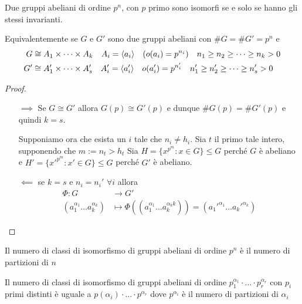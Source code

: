 \begin{theorem}[Classificazione]
    Due gruppi abeliani di ordine \(p^{n}\), con \(p\) primo sono isomorfi se e
    solo se hanno gli stessi invarianti.

    Equivalentemente se \(G\) e \(G'\) sono due gruppi abeliani con \(\#G = \#G'
    = p^{n}\) e
    \begin{align*}
        G &\cong A_{1} \times \dots \times A_{k} \quad A_{i} = {\left\langle a_{i}\right\rangle}
        \quad {(o{(a_{i})} = p^{n_{i}})} \quad n_{1} \ge n_{2} \ge \dots \ge n_k
        > 0\\ 
        G' &\cong A'_{1} \times \dots \times A'_{s} \quad A'_{i} = {\left\langle a'_{i}\right\rangle}
        \quad o{(a_{i}')} = p^{n_{i}'} \quad n_{1}' \ge n_{2}' \ge \dots \ge n_s' > 0
    \end{align*}
\end{theorem}
\begin{proof}\( \)
\begin{itemize}
    \item[\(\implies \)] Se \(G \cong G'\) allora \(G{(p)} \cong G'{(p)}\) e
        dunque \(\# G{(p)} = \# G'(p)\) e quindi \(k = s\).

        Supponiamo ora che esista un \(i\)  tale che \(n_{i} \neq h_{i}\). Sia
        \(t\) il primo tale intero, supponendo che \(m := n_t > h_t\) 
        Sia \(H = \{x^{p^{m}} : x \in G\} \le G\) perché \(G\) è abeliano e \(H'
        = \{x'^{p^{m}} : x' \in G\} \le G\) perché \(G'\) è abeliano.
    \item[\(\impliedby \)] se \(k = s\) e \(n_{i} = n_{i}'\) \(\forall i\)
        allora \begin{align*}
            \Phi: G &\longrightarrow G' \\
        {(a_{1}^{\alpha_{1}} \dots a_k^{\alpha_k})} &\longmapsto
        \Phi({(a_{1}^{\alpha_{1}} \dots a_k^{\alpha_kk})}) =
            {(a_{1}'^{\alpha_{1}} \dots a_{k}'^{\alpha_{k}})} 
        \end{align*}
\end{itemize}
\end{proof}
\begin{corollary}
    Il numero di classi di isomorfismo di gruppi abeliani di ordine \(p^{n}\) è
    il numero di partizioni di \(n\)
\end{corollary}
\begin{corollary}
    Il numero di classi di isomorfismo di gruppi abeliani di ordine
    \(p_{1}^{\alpha_{1}} \cdot \dots \cdot p_r^{\alpha_r}\) con \(p_{i}\) primi
    distinti è uguale a \(p{(\alpha_{i})}\cdot \dots \cdot p^{\alpha_r}\) dove
    \(p^{\alpha_{i}}\) è il numero di partizioni di \(\alpha_{i}\) 
\end{corollary}
